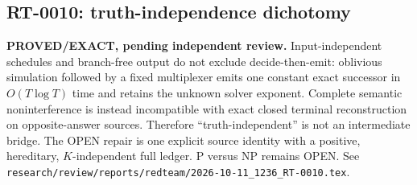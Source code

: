 \subsection{RT-0010: truth-independence dichotomy}
\textbf{PROVED/EXACT, pending independent review.}
Input-independent schedules and branch-free output do not exclude
decide-then-emit: oblivious simulation followed by a fixed multiplexer emits
one constant exact successor in $O(T\log T)$ time and retains the unknown
solver exponent.  Complete semantic noninterference is instead incompatible
with exact closed terminal reconstruction on opposite-answer sources.
Therefore ``truth-independent'' is not an intermediate bridge.  The OPEN
repair is one explicit source identity with a positive, hereditary,
$K$-independent full ledger.  P versus NP remains OPEN.  See
\texttt{research/review/reports/redteam/2026-10-11\_1236\_RT-0010.tex}.
